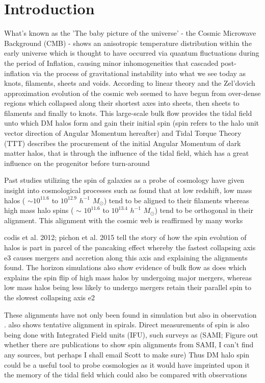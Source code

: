 \documentclass[a4paper,fleqn,usenatbib]{mnras}
\begin{document}
\section{Introduction}
What's known as the 'The baby picture of the universe' - the Cosmic Microwave Background (CMB) - shows an anisotropic temperature distribution within the early universe which is thought to have occurred via quantum fluctuations during the period of Inflation, causing minor inhomogeneities that cascaded post-inflation via the process of gravitational instability into what we see today as knots, filaments, sheets and voids. According to linear theory and the Zel'dovich approximation \citep{Zeldovich_70} evolution of the cosmic web seemed to have begun from over-dense regions which collapsed along their shortest axes into sheets, then sheets to filaments and finally to knots. This large-scale bulk flow provides the tidal field unto which DM halos form and gain their initial spin (spin refers to the halo unit vector direction of Angular Momentum hereafter) and Tidal Torque Theory (TTT) describes the procurement of the initial Angular Momentum of dark matter halos, that is through the influence of the tidal field, which has a great influence on the progenitor before turn-around \citep[Holye 1949][]{Peebles_69,Zeldovich_70}

Past studies utilizing the spin of galaxies as a probe of cosmology have given insight into cosmological processes such as \citet{Trowland_13} found that at low redshift, low mass halos ( $\sim$$10^{11.6}$ to $10^{12.9}$ $h^{-1}$ \(M_\odot\)) tend to be aligned to their filaments whereas high mass halo spins ( $\sim$ $10^{11.6}$ to $10^{13.4}$ $h^{-1}$ \(M_\odot\)) tend to be orthogonal in their alignment. This alignment with the cosmic web is reaffirmed by many works \citep{Zhang_09,Libeskind_12,Dubois_14,Calvo_14,Kang_15,Wang_17,Veena_18} 

\citet{Bond_96}  codis et al. 2012; pichon et al. 2015 tell the story of how the spin evolution of halos is part in parcel of the pancaking effect whereby the fastest collapsing axis e3 causes mergers and accretion along this axis and explaining the alignments found. The horizon simulations \citep{Dubois_14,Welker_14} also show evidence of bulk flow as does \citep{Trowland_13} which explains the spin flip of high mass halos by undergoing major mergers, whereas low mass halos being less likely to undergo mergers retain their parallel spin to the slowest collapsing axis e2

These alignments have not only been found in simulation but also in observation \citep{Jones_10}. \citet{Pen_00} also shows tentative alignment in spirals. Direct measurements of spin is also being done with Integrated Field units (IFU), such surveys as (SAMI; Figure out whether there are publications to show spin alignments from SAMI, I can't find any sources, but perhaps I shall email Scott to make sure) Thus DM halo spin could be a useful tool to probe cosmologies as it would have imprinted upon it the memory of the tidal field which could also be compared with observations 
\end{document}
